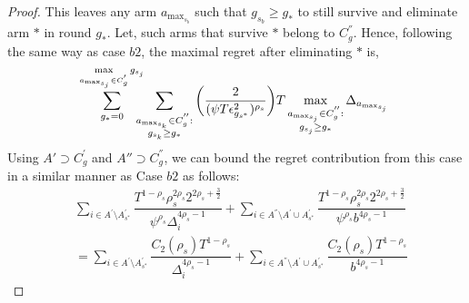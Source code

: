 \begin{proof}
This leaves any arm $a_{\max_{s_{b}}}$ such that $g_{s_{b}}\geq g_{*}$ to still survive and eliminate arm ${*}$ in round $g_{*}$. Let, such arms that survive ${*}$ belong to $C_{g}^{''}$. Hence, following the same way as case $b2$,  the maximal regret after eliminating ${*}$ is,
 \begin{align*}
 \!\!\sum_{g_{*}=0}^{\max\limits_{a_{\max_{s_{j}}}\in C_{g}^{'}}g_{s_{j}}}\!\!\!\!\!\sum_{\substack{\scriptsize a_{\max_{s_{k}}}\in C_{g}^{''}: \\ g_{s_{k}} \geq g_{*}}}\bigg(\dfrac{2}{(\psi T\epsilon_{g_{s^{*}}}^{2})^{\rho_{s}}} \bigg)T\max_{\substack{a_{\max_{s_{j}}}\in C_{g}^{''}: \\ g_{s_{j}}\geq g_{*}}}{\Delta}_{a_{\max_{s_{j}}}}
 \end{align*}
Using $A'\supset C_{g}^{'}$ and $A''\supset C_{g}^{''}$, we can bound the regret contribution from this case in a similar manner as Case $b2$ as follows:
\begin{align*}
 &\sum_{i\in A^{'}\setminus A_{s^*}^{'}}\dfrac{T^{1-\rho_{s}}\rho_{s}^{2\rho_{s}}2^{2\rho_{s}+\frac{3}{2}}}{\psi^{\rho_{s}}\Delta_{i}^{4\rho_{s}-1}} +\sum_{i\in A^{''}\setminus A^{'}\cup A_{s^*}^{'}}\dfrac{T^{1-\rho_{s}}\rho_{s}^{2\rho_{s}}2^{2\rho_{s}+\frac{3}{2}}}{\psi^{\rho_{s}}b^{4\rho_{s}-1}} \\
 & = \sum_{i\in A^{'}\setminus A_{s^*}^{'}}\dfrac{C_{2}(\rho_{s})T^{1-\rho_{s}}}{\Delta_{i}^{4\rho_{s}-1}} +\sum_{i\in A^{''}\setminus A^{'}\cup A_{s^*}^{'}}\dfrac{C_{2}(\rho_{s})T^{1-\rho_{s}}}{b^{4\rho_{s}-1}} 
\end{align*}


\end{proof}
